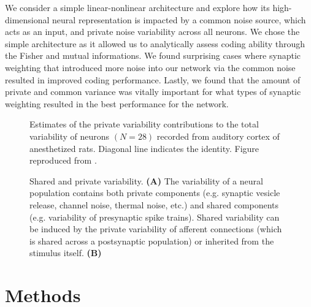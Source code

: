\documentclass[12pt]{article}
\begin{document}
We consider a simple linear-nonlinear architecture and explore how its high-dimensional neural representation is impacted by a common noise source, which acts as an input, and private noise variability across all neurons. We chose the simple architecture as it allowed us to analytically assess coding ability through the Fisher and mutual informations. We found surprising cases where synaptic weighting that introduced more noise into our network via the common noise resulted in improved coding performance. Lastly, we found that the amount of private and common variance was vitally important for what types of synaptic weighting resulted in the best performance for the network.
\begin{figure}[t]
	\centering
	\caption{Shared and private variability. \textbf{(A)} The variability of a neural population contains both private components (e.g. synaptic vesicle release, channel noise, thermal noise, etc.) and shared components (e.g. variability of presynaptic spike trains). Shared variability can be induced by the private variability of afferent connections (which is shared across a postsynaptic population) or inherited from the stimulus itself. \textbf{(B)}} Estimates of the private variability contributions to the total variability of neurons $(N=28)$ recorded from auditory cortex of anesthetized rats. Diagonal line indicates the identity. Figure reproduced from \cite{deweese2004}. 
	\label{fig:private-shared}
\end{figure}

\section{Methods}
\end{document}

